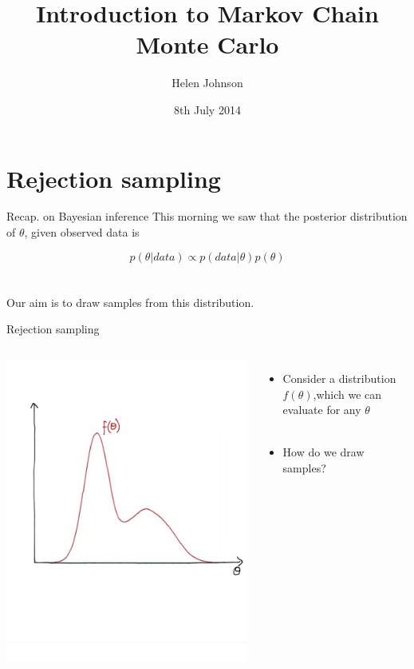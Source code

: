 \documentclass[compress]{beamer}
\title{Introduction to Markov Chain Monte Carlo}
\author{Helen Johnson}
\date{8th July 2014}
\begin{document}
\begin{frame}
\titlepage
\end{frame}

\section{Rejection sampling}
\label{sec-5}
\begin{frame}[label=sec-5-1]{Recap. on Bayesian inference}
This morning we saw that the \alert{posterior distribution} of $\theta$, given observed data is

$$ p(\theta | data) \propto p(data |\theta) p(\theta)$$\\~\\

Our aim is to draw samples from this distribution.
\end{frame}

\begin{frame}[label=sec-5-2]{Rejection sampling}
\begin{columns}[c] 
\includegraphics[width=1\linewidth]{RS1}

\begin{itemize}
\item Consider a distribution $f(\theta)$,which we can evaluate for any $\theta$\\~\\
\item How do we draw samples?
\end{itemize}
\end{columns}
\end{frame}
\end{document}

